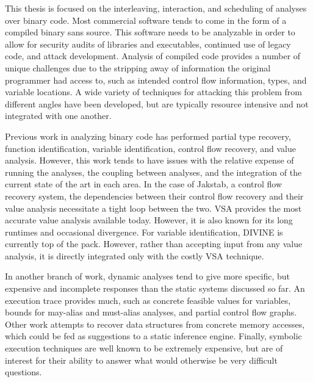 \newcommand{\sysname}{Holmes}
This thesis is focused on the interleaving, interaction, and scheduling of analyses over binary code.
Most commercial software tends to come in the form of a compiled binary sans source.
This software needs to be analyzable in order to allow for security audits of libraries and executables, continued use of legacy code, and attack development.
Analysis of compiled code provides a number of unique challenges due to the stripping away of information the original programmer had access to, such as intended control flow information, types, and variable locations.
A wide variety of techniques for attacking this problem from different angles have been developed, but are typically resource intensive and not integrated with one another.

Previous work in analyzing binary code has performed partial type recovery, function identification, variable identification, control flow recovery, and value analysis.
However, this work tends to have issues with the relative expense of running the analyses, the coupling between analyses, and the integration of the current state of the art in each area.
In the case of Jakstab, a control flow recovery system, the dependencies between their control flow recovery and their value analysis necessitate a tight loop between the two.
VSA provides the most accurate value analysis available today. However, it is also known for its long runtimes and occasional divergence.
For variable identification, DIVINE is currently top of the pack. However, rather than accepting input from any value analysis, it is directly integrated only with the costly VSA technique.

In another branch of work, dynamic analyses tend to give more specific, but expensive and incomplete responses than the static systems discussed so far.
An execution trace provides much, such as concrete feasible values for variables, bounds for may-alias and must-alias analyses, and partial control flow graphs.
Other work attempts to recover data structures from concrete memory accesses, which could be fed as suggestions to a static inference engine.
Finally, symbolic execution techniques are well known to be extremely expensive, but are of interest for their ability to answer what would otherwise be very difficult questions.

